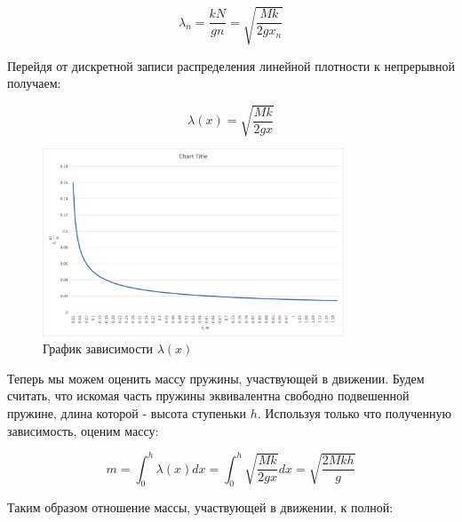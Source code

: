 \documentclass[a4paper, 12pt]{article}
\begin{document}
\bigskip

\begin{equation}
    \lambda_{n} = \frac{kN}{gn} = \sqrt{\frac{Mk}{2gx_{n}}}
\end{equation}

\bigskip

Перейдя от дискретной записи распределения линейной плотности к непрерывной получаем:

\bigskip

\begin{equation}
    \lambda(x) = \sqrt{\frac{Mk}{2gx}}
\end{equation}

\bigskip

\begin{figure}[H]
    \begin{center}
        \includegraphics[width = 0.8\textwidth]{chart.png}
        \caption{График зависимости $\lambda(x)$}
    \end{center}
\end{figure}

\bigskip

Теперь мы можем оценить массу пружины, участвующей в движении. Будем считать, что искомая часть пружины эквивалентна свободно подвешенной пружине, длина которой - высота ступеньки $ h $. Используя только что полученную зависимость, оценим массу:

\bigskip

\begin{equation}
    m = \int_{0}^{h} \lambda(x) dx = \int_{0}^{h} \sqrt{\frac{Mk}{2gx}} dx = \sqrt{\frac{2Mkh}{g}}     
\end{equation}

\bigskip

Таким образом отношение массы, участвующей в движении, к полной:

\bigskip
\end{document}
